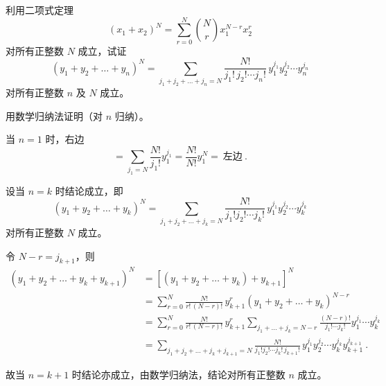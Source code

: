 \begin{questions}
\question 利用二项式定理
\[
(x_1+x_2)^N=\sum_{r=0}^{N}\binom{N}{r}x_1^{N-r}x_2^r
\]
对所有正整数 $N$ 成立，试证
\[
(y_1+y_2+\dots+y_n)^N=\sum_{j_1+j_2+\dots+j_n=N}\frac{N!}{j_1!\,j_2!\cdots j_n!}\,y_1^{j_1}y_2^{j_2}\cdots y_n^{j_n}
\]
对所有正整数 $n$ 及 $N$ 成立。

\begin{solution}
用数学归纳法证明（对 $n$ 归纳）。

当 $n=1$ 时，右边
\[
=\sum_{j_1=N}\frac{N!}{j_1!}y_1^{j_1}=\frac{N!}{N!}y_1^N=\ \text{左边}\ .
\]

设当 $n=k$ 时结论成立，即
\[
(y_1+y_2+\dots+y_k)^N=\sum_{j_1+j_2+\dots+j_k=N}\frac{N!}{j_1!j_2!\cdots j_k!}\,y_1^{j_1}y_2^{j_2}\cdots y_k^{j_k}
\]
对所有正整数 $N$ 成立。

令 $N-r=j_{k+1}$，则
\begin{align*}
(y_1+y_2+\dots+y_k+y_{k+1})^N&=\left[(y_1+y_2+\dots+y_k)+y_{k+1}\right]^N\\
&=\sum_{r=0}^{N}\frac{N!}{r!\,(N-r)!}\,y_{k+1}^{r}(y_1+y_2+\dots+y_k)^{N-r}\\
&=\sum_{r=0}^{N}\frac{N!}{r!\,(N-r)!}\,y_{k+1}^{r}\sum_{j_1+\dots+j_k=N-r}\frac{(N-r)!}{j_1!\cdots j_k!}y_1^{j_1}\cdots y_k^{j_k}\\
&=\sum_{j_1+j_2+\dots+j_k+j_{k+1}=N}\frac{N!}{j_1!j_2!\cdots j_k!\,j_{k+1}!}\,y_1^{j_1}y_2^{j_2}\cdots y_k^{j_k}y_{k+1}^{j_{k+1}}\ .
\end{align*}

故当 $n=k+1$ 时结论亦成立，由数学归纳法，结论对所有正整数 $n$ 成立。
\end{solution}


\question
{}
\end{questions}
